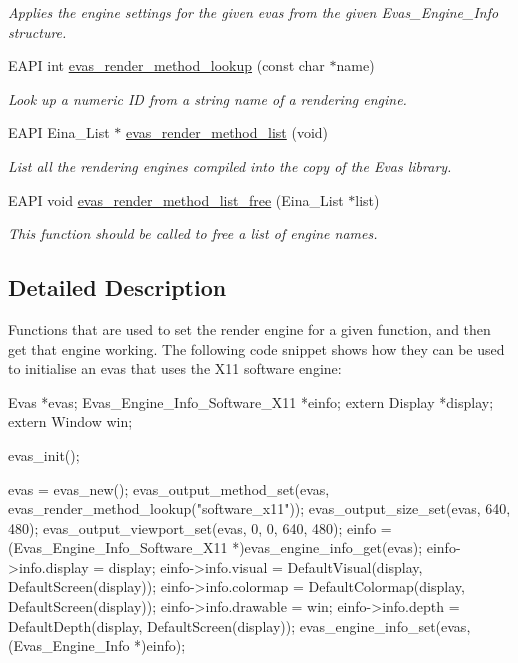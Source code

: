 \begin{DoxyCompactItemize}
\begin{DoxyCompactList}\small\item\em Applies the engine settings for the given evas from the given {\ttfamily Evas\_\-Engine\_\-Info} structure. \item\end{DoxyCompactList}\item 
EAPI int \hyperlink{group__Evas__Output__Method_gad8a701a8d4a2acbb2ce4b741ae55ce6b}{evas\_\-render\_\-method\_\-lookup} (const char $\ast$name)
\begin{DoxyCompactList}\small\item\em Look up a numeric ID from a string name of a rendering engine. \item\end{DoxyCompactList}\item 
EAPI Eina\_\-List $\ast$ \hyperlink{group__Evas__Output__Method_ga23d8fc2c859f5dfcc9f50f441b96d285}{evas\_\-render\_\-method\_\-list} (void)
\begin{DoxyCompactList}\small\item\em List all the rendering engines compiled into the copy of the Evas library. \item\end{DoxyCompactList}\item 
EAPI void \hyperlink{group__Evas__Output__Method_gab7f4a90e3082364eca04b39d3c1c2693}{evas\_\-render\_\-method\_\-list\_\-free} (Eina\_\-List $\ast$list)
\begin{DoxyCompactList}\small\item\em This function should be called to free a list of engine names. \item\end{DoxyCompactList}\end{DoxyCompactItemize}


\subsection{Detailed Description}
Functions that are used to set the render engine for a given function, and then get that engine working. The following code snippet shows how they can be used to initialise an evas that uses the X11 software engine: 
\begin{DoxyCode}
 Evas *evas;
 Evas_Engine_Info_Software_X11 *einfo;
 extern Display *display;
 extern Window win;

 evas_init();

 evas = evas_new();
 evas_output_method_set(evas, evas_render_method_lookup("software_x11"));
 evas_output_size_set(evas, 640, 480);
 evas_output_viewport_set(evas, 0, 0, 640, 480);
 einfo = (Evas_Engine_Info_Software_X11 *)evas_engine_info_get(evas);
 einfo->info.display = display;
 einfo->info.visual = DefaultVisual(display, DefaultScreen(display));
 einfo->info.colormap = DefaultColormap(display, DefaultScreen(display));
 einfo->info.drawable = win;
 einfo->info.depth = DefaultDepth(display, DefaultScreen(display));
 evas_engine_info_set(evas, (Evas_Engine_Info *)einfo);
\end{DoxyCode}
 

